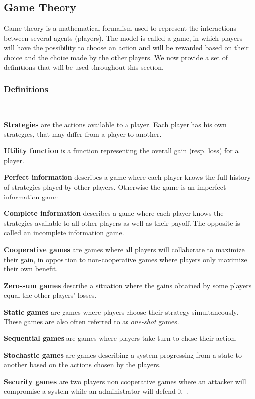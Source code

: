\subsection{Game Theory}

Game theory is a mathematical formalism used to represent the interactions between several agents (\ie players).
The model is called a game, in which players will have the possibility to choose an action and will be rewarded based on their choice and the choice made by the other players.
We now provide a set of definitions that will be used throughout this section.

\subsubsection{Definitions}\textbf{\\}

\textbf{Strategies} are the actions available to a player. Each player has his own strategies, that may differ from a player to another.

\textbf{Utility function} is a function representing the overall gain (resp. loss) for a player.

\textbf{Perfect information} describes a game where each player knows the full history of strategies played by other players. Otherwise the game is an imperfect information game.

\textbf{Complete information} describes a game where each player knows the strategies available to all other players as well as their payoff. The opposite is called an incomplete information game.

\textbf{Cooperative games} are games where all players will collaborate to maximize their gain, in opposition to non-cooperative games where players only maximize their own benefit.

\textbf{Zero-sum games} describe a situation where the gains obtained by some players equal the other players' losses.

\textbf{Static games} are games where players choose their strategy simultaneously. These games are also often referred to as \textit{one-shot} games.

\textbf{Sequential games} are games where players take turn to chose their action.

\textbf{Stochastic games} are games describing a system progressing from a state to another based on the actions chosen by the players.

\textbf{Security games} are two players non cooperative games where an attacker will compromise a system while an administrator will defend it~\cite{book-gt}.


